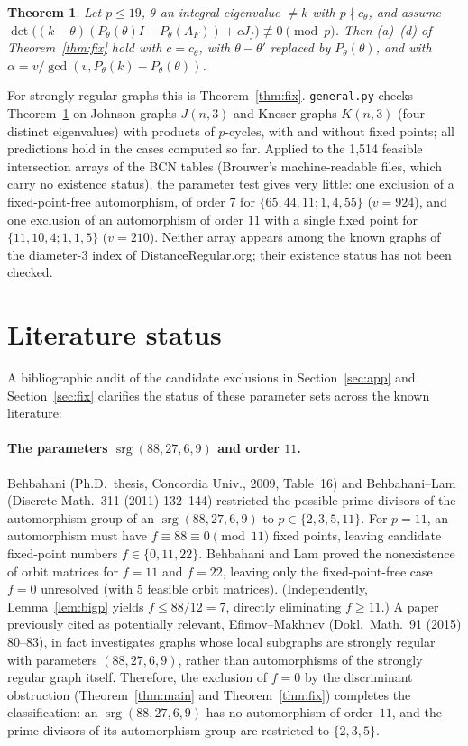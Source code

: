 \documentclass[11pt,a4paper]{article}
\newtheorem{theorem}{Theorem}
\theoremstyle{remark}
\newcommand{\srg}{\operatorname{srg}}
\begin{document}
\begin{theorem}\label{thm:gen}
Let $p\le19$, $\theta$ an integral eigenvalue $\ne k$ with $p\nmid c_\theta$, and assume
$\det\bigl((k-\theta)(P_\theta(\theta)I-P_\theta(A_F))+cJ_f\bigr)\not\equiv0\pmod p$. Then (a)--(d) of Theorem~\ref{thm:fix} hold with
$c=c_\theta$, with $\theta-\theta'$ replaced by $P_\theta(\theta)$, and with $\alpha=v/\gcd(v,P_\theta(k)-P_\theta(\theta))$.
\end{theorem}

For strongly regular graphs this is Theorem~\ref{thm:fix}. \texttt{general.py} checks Theorem~\ref{thm:gen} on Johnson graphs
$J(n,3)$ and Kneser graphs $K(n,3)$ (four distinct eigenvalues) with products of $p$-cycles, with and without fixed points; all
predictions hold in the cases computed so far. Applied to the 1{,}514 feasible intersection arrays of the BCN tables (Brouwer's
machine-readable files, which carry no existence status), the parameter test gives very little: one exclusion of a
fixed-point-free automorphism, of order $7$ for $\{65,44,11;1,4,55\}$ ($v=924$), and one exclusion of an automorphism of order $11$
with a single fixed point for $\{11,10,4;1,1,5\}$ ($v=210$). Neither array appears among the known graphs of the diameter-3 index of
DistanceRegular.org; their existence status has not been checked.

\section{Literature status}\label{sec:lit}

A bibliographic audit of the candidate exclusions in Section~\ref{sec:app} and Section~\ref{sec:fix} clarifies the status of these parameter sets across the known literature:

\paragraph{The parameters $\srg(88,27,6,9)$ and order $11$.}
Behbahani (Ph.D.\ thesis, Concordia Univ., 2009, Table~16) and Behbahani--Lam (Discrete Math.\ 311 (2011) 132--144) restricted the possible prime divisors of the automorphism group of an $\srg(88,27,6,9)$ to $p \in \{2,3,5,11\}$.
For $p = 11$, an automorphism must have $f \equiv 88 \equiv 0 \pmod{11}$ fixed points, leaving candidate fixed-point numbers $f \in \{0, 11, 22\}$.
Behbahani and Lam proved the nonexistence of orbit matrices for $f = 11$ and $f = 22$, leaving only the fixed-point-free case $f = 0$ unresolved (with 5 feasible orbit matrices).
(Independently, Lemma~\ref{lem:bigp} yields $f \le 88/12 = 7$, directly eliminating $f \ge 11$.)
A paper previously cited as potentially relevant, Efimov--Makhnev (Dokl.\ Math.\ 91 (2015) 80--83), in fact investigates graphs whose local subgraphs are strongly regular with parameters $(88,27,6,9)$, rather than automorphisms of the strongly regular graph itself.
Therefore, the exclusion of $f = 0$ by the discriminant obstruction (Theorem~\ref{thm:main} and Theorem~\ref{thm:fix}) completes the classification: an $\srg(88,27,6,9)$ has no automorphism of order~$11$, and the prime divisors of its automorphism group are restricted to $\{2, 3, 5\}$.
\end{document}
